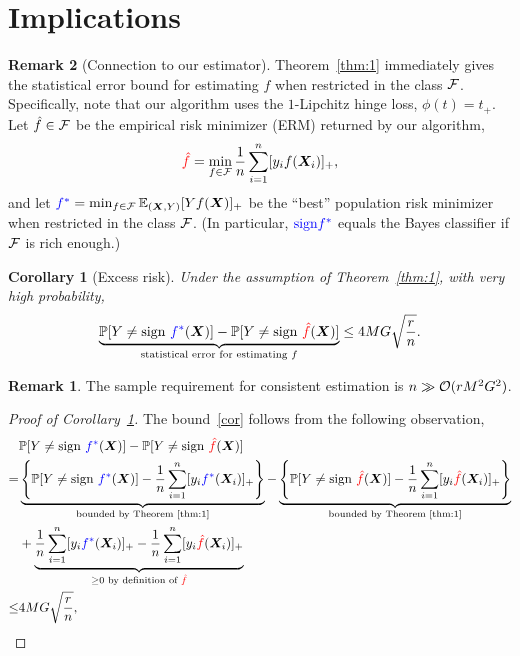 \documentclass[11pt]{article}
\theoremstyle{plain}
\newtheorem{cor}{Corollary}
\theoremstyle{definition}
\newtheorem{rmk}{Remark}
\newcommand*{\KeepStyleUnderBrace}[1]{%
  \mathop{%
    \mathchoice
    {\underbrace{\displaystyle#1}}%
    {\underbrace{\textstyle#1}}%
    {\underbrace{\scriptstyle#1}}%
    {\underbrace{\scriptscriptstyle#1}}%
  }\limits
}
\begin{document}
\section{Implications}
\begin{rmk}[Connection to our estimator] Theorem~\ref{thm:1} immediately gives the statistical error bound for estimating $f$ when restricted in the class $\mathcal{F}$. Specifically, note that our algorithm uses the $1$-Lipchitz hinge loss, $\phi(t)=t_{+}$. Let $\hat f \in \mathcal{F}$ be the empirical risk minimizer (ERM) returned by our algorithm,
\begin{equation}\label{eq:C}
{\color{red}\hat f}=\min_{f\in \mathcal{F}}{1\over n}\sum_{i=1}^n [y_if(\bm X_i)]_{+},
\end{equation}
and let ${\color{blue}f^*}=\min_{f\in\mathcal{F}} \mathbb{E}_{(\bm X,Y)}[Yf(\bm X)]_{+}$ be the ``best'' population risk minimizer when restricted in the class $\mathcal{F}$. (In particular, $\color{blue}\text{sign}f^*$ equals the Bayes classifier if $\mathcal{F}$ is rich enough.) \\
\begin{cor}[Excess risk]\label{cor:risk} Under the assumption of Theorem~\ref{thm:1}, with very high probability, 
\begin{equation}\label{cor}
\KeepStyleUnderBrace{\mathbb{P}[Y\neq \text{sign }{\color{blue}f^*}(\mX)] - \mathbb{P}[Y\neq \text{sign } {\color{red}\hat f}(\mX)]}_{\text{statistical error for estimating $f$}}\leq 4MG\sqrt{r\over n}.
\end{equation}
\end{cor}

\begin{rmk}
The sample requirement for consistent estimation is $n\gg \mathcal{O}(rM^2G^2)$.
\end{rmk}

\begin{proof}[Proof of Corollary~\ref{cor:risk}]
The bound~\eqref{cor} follows from the following observation,
\begin{align}
&\mathbb{P}[Y\neq \text{sign }{\color{blue}f^*}(\mX)] - \mathbb{P}[Y\neq \text{sign }{\color{red} \hat f}(\mX)] \\
=& \KeepStyleUnderBrace{\left\{\mathbb{P}[Y\neq \text{sign } {\color{blue}f^*}(\mX)]  - {1\over n}\sum_{i=1}^n [y_i {\color{blue}f^*}(\mX_i)]_{+}\right\}}_{\text{bounded by Theorem~\ref{thm:1}}} - \KeepStyleUnderBrace{\left\{\mathbb{P}[Y\neq \text{sign } {\color{red}\hat f}(\mX)] - {1\over n}\sum_{i=1}^n [y_i {\color{red}\hat f}(\mX_i)]_{+}\right\}}_{\text{bounded by Theorem~\ref{thm:1}}}\\
& + \KeepStyleUnderBrace{{1\over n}\sum_{i=1}^n [y_i {\color{blue}f^*}(\mX_i)]_{+}-{1\over n}\sum_{i=1}^n [y_i {\color{red}\hat f}(\mX_i)]_{+}}_{\geq 0 \text{ by definition of }{\color{red} \hat f}}\\ 
 \leq& 4MG\sqrt{r\over n},
\end{align}
\vspace{-.5cm}
\end{proof}
\end{rmk}
\end{document}
